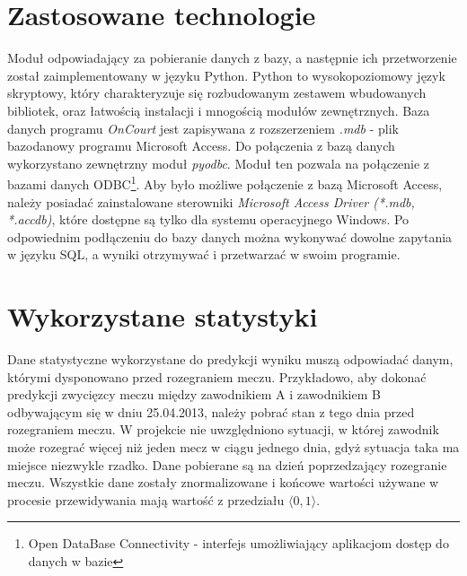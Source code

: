 \section{Zastosowane technologie}
\label{Sec:DataTech}
Moduł odpowiadający za pobieranie danych z bazy, a następnie ich przetworzenie został zaimplementowany w języku Python. Python to wysokopoziomowy język skryptowy, który charakteryzuje się rozbudowanym zestawem wbudowanych bibliotek, oraz łatwością instalacji i mnogością modułów zewnętrznych.
Baza danych programu \textit{OnCourt} jest zapisywana z rozszerzeniem \textit{.mdb} - plik bazodanowy programu Microsoft Access. Do połączenia z bazą danych wykorzystano zewnętrzny moduł \textit{pyodbc}. Moduł ten pozwala na połączenie z bazami danych ODBC\footnote{Open DataBase Connectivity - interfejs umożliwiający aplikacjom dostęp do danych w bazie}. Aby było możliwe połączenie z bazą Microsoft Access, należy posiadać zainstalowane sterowniki \textit{Microsoft Access Driver (*.mdb, *.accdb)}, które dostępne są tylko dla systemu operacyjnego Windows. Po odpowiednim podłączeniu do bazy danych można wykonywać dowolne zapytania w języku SQL, a wyniki otrzymywać i przetwarzać w swoim programie.

\section{Wykorzystane statystyki}
\label{Sec:DataUsed}
Dane statystyczne wykorzystane do predykcji wyniku muszą odpowiadać danym, którymi dysponowano przed rozegraniem meczu. 
Przykładowo, aby dokonać predykcji zwycięzcy meczu między zawodnikiem A i zawodnikiem B odbywającym się w dniu 25.04.2013, należy pobrać stan z tego dnia przed rozegraniem meczu. W projekcie nie uwzględniono sytuacji, w której zawodnik może rozegrać więcej niż jeden mecz w ciągu jednego dnia, gdyż sytuacja taka ma miejsce niezwykle rzadko. Dane pobierane są na dzień poprzedzający rozegranie meczu. Wszystkie dane zostały znormalizowane i końcowe wartości używane w procesie przewidywania mają wartość z przedziału $\langle 0, 1\rangle$. 

